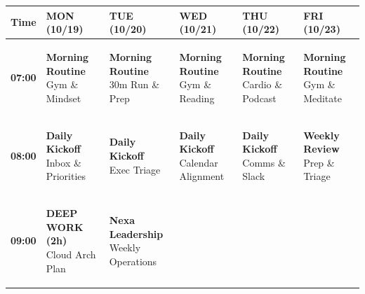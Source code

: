 \documentclass[10pt, landscape]{article}
\begin{document}
\begin{minipage}[t]{0.72\linewidth}
  \setlength{\extrarowheight}{1.5pt}
  \begin{tabularx}{\linewidth}{|c|>{\raggedright\arraybackslash}X|>{\raggedright\arraybackslash}X|>{\raggedright\arraybackslash}X|>{\raggedright\arraybackslash}X|>{\raggedright\arraybackslash}X|}
    \hline
    \rowcolor{ExecNavy}
    \color{white}\textbf{Time} & \color{white}\textbf{MON (10/19)} & \color{white}\textbf{TUE (10/20)} & \color{white}\textbf{WED (10/21)} & \color{white}\textbf{THU (10/22)} & \color{white}\textbf{FRI (10/23)} \\
    \hline
    \textbf{07:00} &
    \colorbox{PersonalBg}{\parbox[t]{0.92\linewidth}{\tiny\color{PersonalTxt}\textbf{Morning Routine}\\Gym \& Mindset}} &
    \colorbox{PersonalBg}{\parbox[t]{0.92\linewidth}{\tiny\color{PersonalTxt}\textbf{Morning Routine}\\30m Run \& Prep}} &
    \colorbox{PersonalBg}{\parbox[t]{0.92\linewidth}{\tiny\color{PersonalTxt}\textbf{Morning Routine}\\Gym \& Reading}} &
    \colorbox{PersonalBg}{\parbox[t]{0.92\linewidth}{\tiny\color{PersonalTxt}\textbf{Morning Routine}\\Cardio \& Podcast}} &
    \colorbox{PersonalBg}{\parbox[t]{0.92\linewidth}{\tiny\color{PersonalTxt}\textbf{Morning Routine}\\Gym \& Meditate}} \\
    \hline
    \textbf{08:00} &
    \colorbox{AdminBg}{\parbox[t]{0.92\linewidth}{\tiny\color{AdminTxt}\textbf{Daily Kickoff}\\Inbox \& Priorities}} &
    \colorbox{AdminBg}{\parbox[t]{0.92\linewidth}{\tiny\color{AdminTxt}\textbf{Daily Kickoff}\\Exec Triage}} &
    \colorbox{AdminBg}{\parbox[t]{0.92\linewidth}{\tiny\color{AdminTxt}\textbf{Daily Kickoff}\\Calendar Alignment}} &
    \colorbox{AdminBg}{\parbox[t]{0.92\linewidth}{\tiny\color{AdminTxt}\textbf{Daily Kickoff}\\Comms \& Slack}} &
    \colorbox{AdminBg}{\parbox[t]{0.92\linewidth}{\tiny\color{AdminTxt}\textbf{Weekly Review}\\Prep \& Triage}} \\
    \hline
    \textbf{09:00} &
    \colorbox{DeepWorkBg}{\parbox[t]{0.92\linewidth}{\tiny\color{DeepWorkTxt}\textbf{DEEP WORK (2h)}\\Cloud Arch Plan}} &
    \colorbox{MeetingBg}{\parbox[t]{0.92\linewidth}{\tiny\color{MeetingTxt}\textbf{Nexa Leadership}\\Weekly Operations}} &

\end{tabularx}
\end{minipage}
\end{document}

